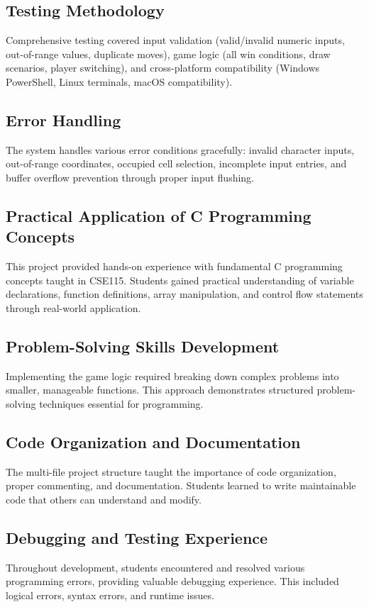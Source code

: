 \documentclass[12pt]{article}
\begin{document}
\subsection{Testing Methodology}
Comprehensive testing covered input validation (valid/invalid numeric inputs, out-of-range values, duplicate moves), game logic (all win conditions, draw scenarios, player switching), and cross-platform compatibility (Windows PowerShell, Linux terminals, macOS compatibility).

\subsection{Error Handling}
The system handles various error conditions gracefully: invalid character inputs, out-of-range coordinates, occupied cell selection, incomplete input entries, and buffer overflow prevention through proper input flushing.

\subsection{Practical Application of C Programming Concepts}
This project provided hands-on experience with fundamental C programming concepts taught in CSE115. Students gained practical understanding of variable declarations, function definitions, array manipulation, and control flow statements through real-world application.

\subsection{Problem-Solving Skills Development}
Implementing the game logic required breaking down complex problems into smaller, manageable functions. This approach demonstrates structured problem-solving techniques essential for programming.

\subsection{Code Organization and Documentation}
The multi-file project structure taught the importance of code organization, proper commenting, and documentation. Students learned to write maintainable code that others can understand and modify.

\subsection{Debugging and Testing Experience}
Throughout development, students encountered and resolved various programming errors, providing valuable debugging experience. This included logical errors, syntax errors, and runtime issues.
\end{document}
